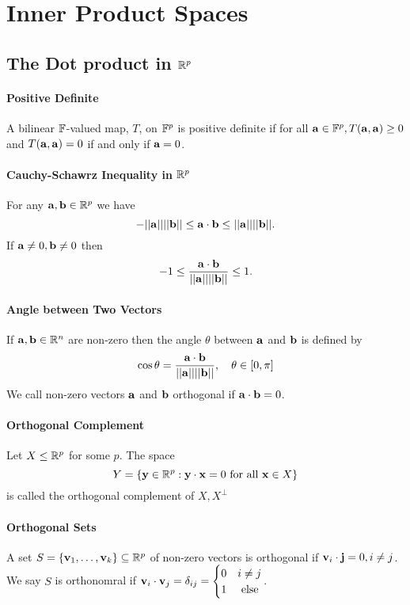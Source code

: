 \section{Inner Product Spaces}
\subsection{The Dot product in \texorpdfstring{\(\mathbb{R}^p\)}{R\textasciicircum p}}

\paragraph{Positive Definite}
A bilinear \(\mathbb{F}\)-valued map, \(T\), on \(\mathbb{F}^p\) is positive definite if for all \(\mathbf{a} \in \mathbb{F}^p, T(\mathbf{a}, \mathbf{a}) \geq 0\) and \(T(\mathbf{a}, \mathbf{a}) = 0\) if and only if \(\mathbf{a} = 0\).

\paragraph{Cauchy-Schawrz Inequality in \(\mathbb{R}^p\)}
For any \(\mathbf{a}, \mathbf{b} \in \mathbb{R}^p\) we have
\[-||\mathbf{a}||||\mathbf{b}|| \leq \mathbf{a} \cdot \mathbf{b} \leq ||\mathbf{a}||||\mathbf{b}||.\]
If \(\mathbf{a} \neq 0, \mathbf{b} \neq 0\) then
\[-1 \leq \frac{\mathbf{a} \cdot \mathbf{b}}{||\mathbf{a}||||\mathbf{b}||} \leq 1.\]

\paragraph{Angle between Two Vectors}
If \(\mathbf{a}, \mathbf{b} \in \mathbb{R}^n\) are non-zero then the angle \(\theta\) between \(\mathbf{a}\) and \(\mathbf{b}\) is defined by 
\[\cos \theta = \frac{\mathbf{a} \cdot \mathbf{b}}{||\mathbf{a}||||\mathbf{b}||}, \quad \theta \in [0, \pi]\]
We call non-zero vectors \(\mathbf{a}\) and \(\mathbf{b}\) orthogonal if \(\mathbf{a} \cdot \mathbf{b} = 0\).

\paragraph{Orthogonal Complement}
Let \(X \leq \mathbb{R}^p\) for some \(p\). The space
\[Y = \{\mathbf{y} \in \mathbb{R}^p: \mathbf{y} \cdot \mathbf{x} = 0 \text{ for all } \mathbf{x} \in X\}\]
is called the orthogonal complement of \(X, X^\perp\)

\paragraph{Orthogonal Sets}
A set \(S = \{\mathbf{v}_1, \dots, \mathbf{v}_k\} \subseteq \mathbb{R}^p\) of non-zero vectors is orthogonal if \(\mathbf{v}_i \cdot \mathbf{j} = 0, i \neq j\). We say \(S\) is orthonomral if \(\mathbf{v}_i \cdot \mathbf{v}_j = \delta_{ij} = \begin{cases}
    0 & i \neq j \\
    1 & \text{ else}
\end{cases}\).

